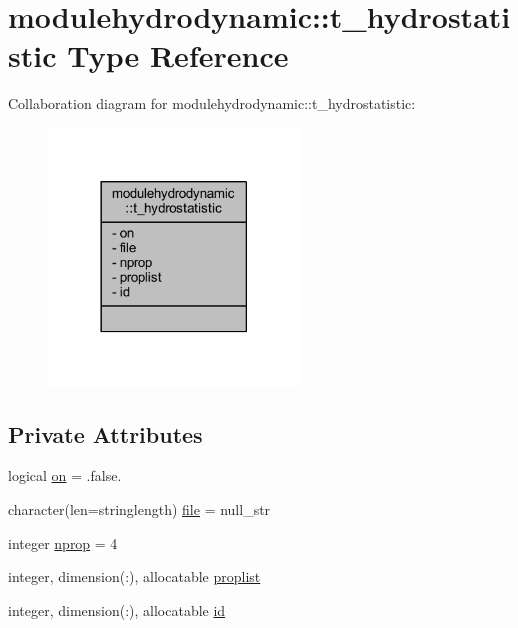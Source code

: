 \hypertarget{structmodulehydrodynamic_1_1t__hydrostatistic}{}\section{modulehydrodynamic\+:\+:t\+\_\+hydrostatistic Type Reference}
\label{structmodulehydrodynamic_1_1t__hydrostatistic}


Collaboration diagram for modulehydrodynamic\+:\+:t\+\_\+hydrostatistic\+:\nopagebreak
\begin{figure}[H]
\begin{center}
\leavevmode
\includegraphics[width=189pt]{structmodulehydrodynamic_1_1t__hydrostatistic__coll__graph}
\end{center}
\end{figure}
\subsection*{Private Attributes}
\begin{DoxyCompactItemize}
\item 
logical \mbox{\hyperlink{structmodulehydrodynamic_1_1t__hydrostatistic_a6a6da4739679553502793a09ed87a501}{on}} = .false.
\item 
character(len=stringlength) \mbox{\hyperlink{structmodulehydrodynamic_1_1t__hydrostatistic_a4d3b55005ede99b84414daa35bcbff13}{file}} = null\+\_\+str
\item 
integer \mbox{\hyperlink{structmodulehydrodynamic_1_1t__hydrostatistic_a9279a9c8cc352562bc76635126908467}{nprop}} = 4
\item 
integer, dimension(\+:), allocatable \mbox{\hyperlink{structmodulehydrodynamic_1_1t__hydrostatistic_a69ce50f1c1e365c94ee63e49f73f0a1c}{proplist}}
\item 
integer, dimension(\+:), allocatable \mbox{\hyperlink{structmodulehydrodynamic_1_1t__hydrostatistic_a7a73c4828a1d47ccb8eb9c51480a420e}{id}}
\end{DoxyCompactItemize}


